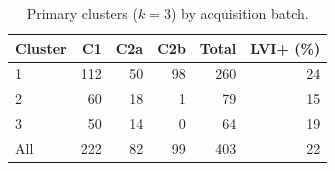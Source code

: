 \begin{table}[htbp]
\centering
\small
\caption{Primary clusters ($k=3$) by acquisition batch.}
\label{tab:ue-clbatch}
\begin{tabular}{lrrrrr}
\toprule
Cluster & C1 & C2a & C2b & Total & LVI+ (\%) \\
\midrule
1 & 112 & 50 & 98 & 260 & 24 \\
2 & 60 & 18 & 1 & 79 & 15 \\
3 & 50 & 14 & 0 & 64 & 19 \\
All & 222 & 82 & 99 & 403 & 22 \\
\bottomrule
\end{tabular}
\end{table}
